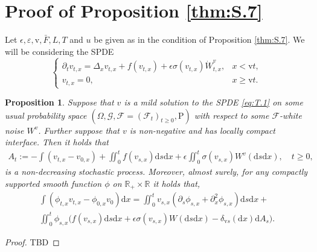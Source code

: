 \documentclass[12pt,a4paper]{amsart}
\numberwithin{equation}{section}
\theoremstyle{plain}
\newtheorem{proposition}[theorem]{Proposition}
\theoremstyle{remark}
\begin{document}
\section{Proof of Proposition \ref{thm:S.7}}
	Let $\epsilon, \varepsilon, \mathrm v, \bar F, L, T$ and $u$ be given as in the condition of Proposition \ref{thm:S.7}. 
	We will be considering the SPDE
\begin{equation} \label{eq:T.1}
\begin{cases}
\partial_t v_{t,x} 
=\Delta_x v_{t,x} + f(v_{t,x}) + \epsilon \sigma(v_{t,x}) \dot W^v_{t,x},
& x < \mathrm v t,
\\v_{t,x}
= 0,
& x\geq \mathrm v t.
\end{cases}
\end{equation}
\begin{proposition} \label{thm:T.1}
	Suppose that $v$ is a mild solution to the SPDE \eqref{eq:T.1} on some usual probability space $(\Omega, \mathcal G, \mathcal F=(\mathcal F_t)_{t\geq 0}, \mathrm P)$ with respect to some $\mathcal F$-white noise $W^v$.
	Further suppose that $v$ is non-negative and has locally compact interface. 
	Then it holds that
	\begin{equation} \label{eq:T.2}
	\begin{multlined}
	A_t
	:= - \int (v_{t,x}- v_{0,x}) + \iint_0^t f(v_{s,x}) \mathrm ds\mathrm dx +\epsilon \iint_0^t \sigma(v_{s,x}) W^v(\mathrm ds\mathrm dx),
	\quad t\geq 0,
	\end{multlined}
	\end{equation}
	is a non-decreasing stochastic process.
	Moreover, almost surely, for any compactly supported smooth function $\phi$ on $\mathbb R_+\times \mathbb R$ it holds that,
	\begin{equation}
	\begin{multlined}
	\int (\phi_{t,x} v_{t,x} - \phi_{0,x}v_0) \mathrm dx
	=  \iint_0^t v_{s,x}(\partial_s \phi_{s,x} + \partial^2_x\phi_{s,x}) \mathrm ds \mathrm dx + {}
	\\ \iint_0^t \phi_{s,x} \big( f(v_{s,x}) \mathrm ds \mathrm dx + \epsilon \sigma(v_{s,x})W(\mathrm ds\mathrm dx) - \delta_{\mathrm vs}(\mathrm dx) \mathrm d A_s\big).
	\end{multlined}
	\end{equation}
\end{proposition}
\begin{proof}
	\color{blue}
	TBD
\end{proof}
	
\end{document}
